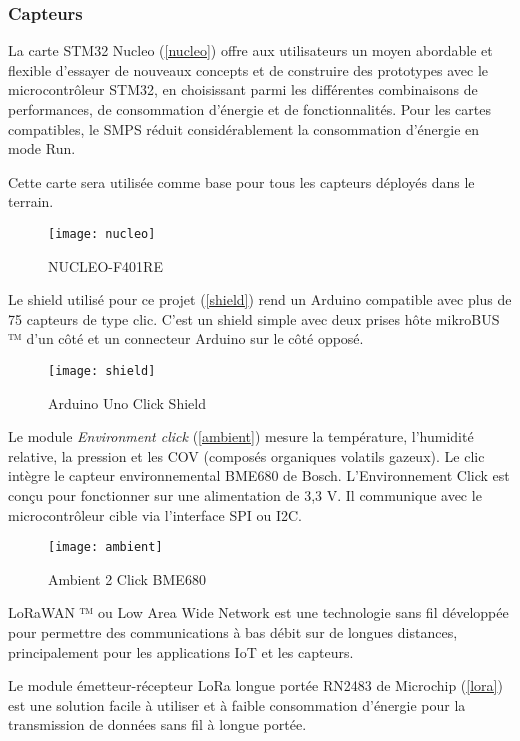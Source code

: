 \subsubsection{Capteurs}
La carte STM32 Nucleo (\autoref{nucleo}) offre aux utilisateurs un moyen abordable et flexible d'essayer de nouveaux concepts et de construire des prototypes avec le microcontrôleur STM32, en choisissant parmi les différentes combinaisons de performances, de consommation d'énergie et de fonctionnalités. Pour les cartes compatibles, le SMPS réduit considérablement la consommation d'énergie en mode Run.

Cette carte sera utilisée comme base pour tous les capteurs déployés dans le terrain.

\begin{figure}[!h]
	\centering
	\texttt{[image: nucleo]}
	\caption{NUCLEO-F401RE}
	\label{nucleo}
\end{figure}

\newpage
Le shield utilisé pour ce projet (\autoref{shield}) rend un Arduino compatible avec plus de 75 capteurs de type clic. C'est un shield simple avec deux prises hôte mikroBUS ™ d'un côté et un connecteur Arduino sur le côté opposé.

\begin{figure}[!h]
	\centering
	\texttt{[image: shield]}
	\caption{Arduino Uno Click Shield}
	\label{shield}
\end{figure}

Le module \textit{Environment click} (\autoref{ambient}) mesure la température, l'humidité relative, la pression et les COV (composés organiques volatils gazeux). Le clic intègre le capteur environnemental BME680 de Bosch. L'Environnement Click est conçu pour fonctionner sur une alimentation de 3,3 V. Il communique avec le microcontrôleur cible via l'interface SPI ou I2C.

\begin{figure}[!h]
	\centering
	\texttt{[image: ambient]}
	\caption{Ambient 2 Click BME680}
	\label{ambient}
\end{figure}

\newpage
LoRaWAN ™ ou Low Area Wide Network est une technologie sans fil développée pour permettre des communications à bas débit sur de longues distances, principalement pour les applications IoT et les capteurs.

Le module émetteur-récepteur LoRa longue portée RN2483 de Microchip (\autoref{lora}) est une solution facile à utiliser et à faible consommation d'énergie pour la transmission de données sans fil à longue portée.

